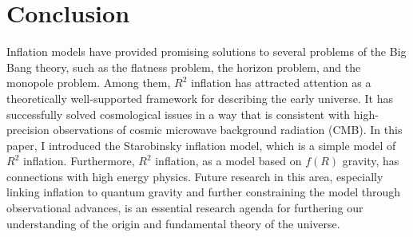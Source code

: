 \documentclass[12pt]{article}
\numberwithin{equation}{section}
\begin{document}
\section{Conclusion}
Inflation models have provided promising solutions to several problems of the Big Bang theory, such as the flatness problem, the horizon problem, and the monopole problem. Among them, $R^2$ inflation has attracted attention as a theoretically well-supported framework for describing the early universe. It has successfully solved cosmological issues in a way that is consistent with high-precision observations of cosmic microwave background radiation (CMB). In this paper, I introduced the Starobinsky inflation model, which is a simple model of $R^2$ inflation. Furthermore, $R^2$ inflation, as a model based on $f(R)$ gravity, has connections with high energy physics. Future research in this area, especially linking inflation to quantum gravity and further constraining the model through observational advances, is an essential research agenda for furthering our understanding of the origin and fundamental theory of the universe.

\newpage
{}


\end{document}
